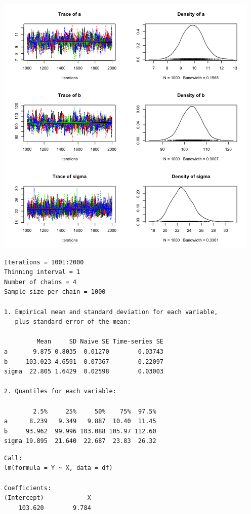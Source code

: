 \documentclass{beamer}
\begin{document}
\begin{frame}[fragile]
  \begin{center}
    \includegraphics[scale = 0.4]{../graphs/ols/plot1.png}
  \end{center}
\end{frame}

\begin{frame}[fragile]
  \begin{verbatim}
Iterations = 1001:2000
Thinning interval = 1 
Number of chains = 4 
Sample size per chain = 1000 

1. Empirical mean and standard deviation for each variable,
   plus standard error of the mean:

         Mean     SD Naive SE Time-series SE
a       9.875 0.8035  0.01270        0.03743
b     103.023 4.6591  0.07367        0.22097
sigma  22.805 1.6429  0.02598        0.03003

2. Quantiles for each variable:

        2.5%     25%     50%    75%  97.5%
a      8.239   9.349   9.887  10.40  11.45
b     93.962  99.996 103.088 105.97 112.60
sigma 19.895  21.640  22.687  23.83  26.32
  \end{verbatim}
\end{frame}

\begin{frame}[fragile]
  \begin{verbatim}
Call:
lm(formula = Y ~ X, data = df)

Coefficients:
(Intercept)            X  
    103.620        9.784  
  \end{verbatim}
\end{frame}
\end{document}
